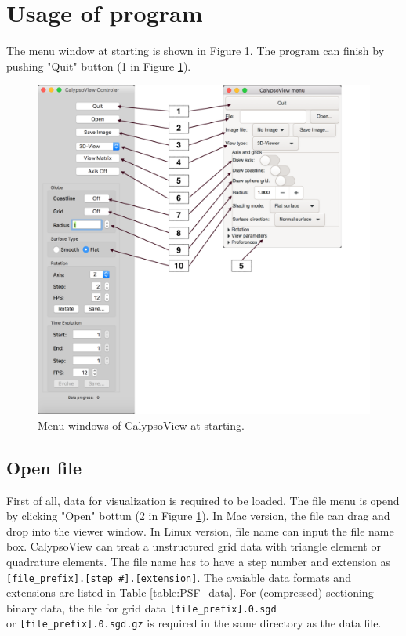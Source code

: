 \section{Usage of program}
\label{section:usage}
The menu window at starting is shown in Figure \ref{fig:menu_1}. The program can finish by pushing "Quit" button (1 in Figure \ref{fig:menu_1}).
%
\begin{figure}[htbp]
\begin{center}
\includegraphics*[width=120mm]{images/menu_1}
\end{center}
\caption{Menu windows of CalypsoView at starting.}
\label{fig:menu_1}
\end{figure}
%

\subsection{Open file}
First of all, data for visualization is required to be loaded. The file menu is opend by clicking "Open" bottun 
(2 in Figure \ref{fig:menu_1}). In Mac version, the file can drag and drop into the viewer window. In Linux version, file name can input the file name box. CalypsoView can treat a unstructured grid data with triangle element or quadrature elements. The file name has to have a step number and extension as \verb|[file_prefix].[step #].[extension]|. The avaiable data formats and extensions are listed in Table \ref{table:PSF_data}. For (compressed) sectioning binary data, the file for grid data \verb|[file_prefix].0.sgd| \\
  or \verb|[file_prefix].0.sgd.gz| is required in the same directory as the data file.


